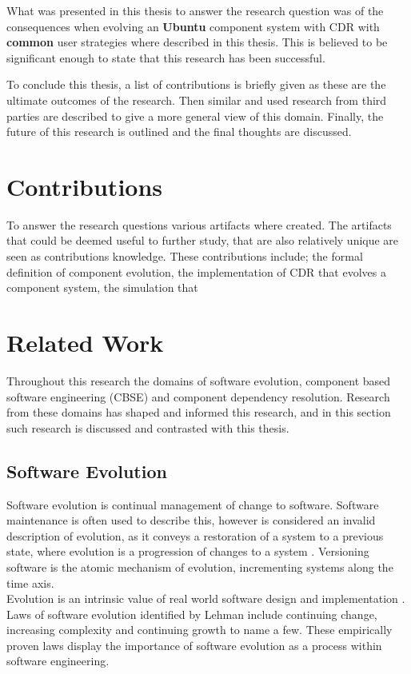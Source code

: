 What was presented in this thesis to answer the research question was 
 of the consequences when evolving an \textbf{Ubuntu} component system with CDR with \textbf{common} user strategies where described in this thesis.
This is believed to be significant enough to state that this research has been successful.  

To conclude this thesis, a list of contributions is briefly given as these are the ultimate outcomes of the research.
Then similar and used research from third parties are described to give a more general view of this domain.
Finally, the future of this research is outlined and the final thoughts are discussed.

\section{Contributions}
To answer the research questions various artifacts where created.
The artifacts that could be deemed useful to further study, that are also relatively unique are seen as contributions knowledge. 
These contributions include; the formal definition of component evolution, the implementation of CDR that evolves a component system,
the simulation that  






\section{Related Work}
Throughout this research the domains of software evolution, component based software engineering (CBSE) and component dependency resolution.
Research from these domains has shaped and informed this research, and in this section such research is discussed and contrasted with this thesis.

\subsection{Software Evolution}
Software evolution is continual management of change to software. 
Software maintenance is often used to describe this,
however is considered an invalid description of evolution, as it conveys a
restoration of a system to a previous state, where evolution is a progression
of changes to a system \citep{lehman_software_2006}. Versioning software is the atomic mechanism of evolution, 
incrementing systems along the time axis.\\ 
Evolution is an intrinsic value of real world software
design and implementation \citep{lehman_programs_1980}. Laws of software
evolution identified by Lehman include continuing change, increasing complexity and
continuing growth \citep{lehman_rules_2001} to name a few. These empirically proven laws
display the importance of software evolution as a process within software
engineering.

